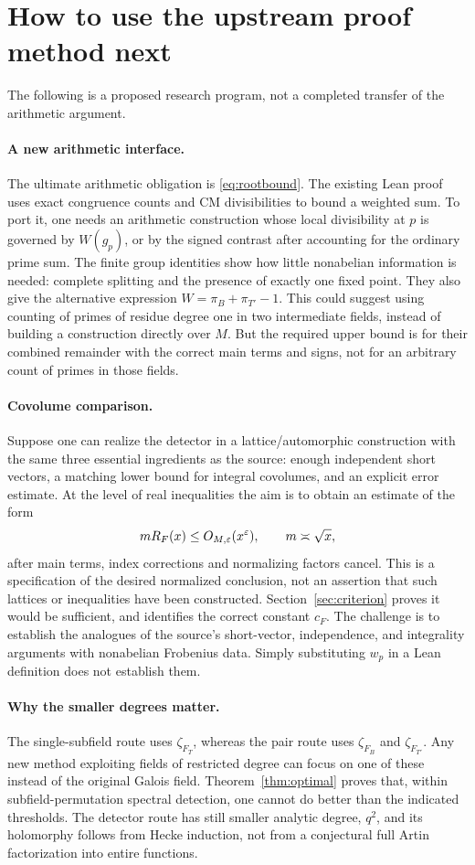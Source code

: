 \documentclass[11pt]{article}
\theoremstyle{remark}\newtheorem{remark}[theorem]{Remark}
\begin{document}
\section{How to use the upstream proof method next}
The following is a proposed research program, not a completed transfer of the arithmetic argument.

\paragraph{A new arithmetic interface.} The ultimate arithmetic obligation is \eqref{eq:rootbound}. The existing Lean proof uses exact congruence counts and CM divisibilities to bound a weighted sum. To port it, one needs an arithmetic construction whose local divisibility at $p$ is governed by $W(g_p)$, or by the signed contrast after accounting for the ordinary prime sum. The finite group identities show how little nonabelian information is needed: complete splitting and the presence of exactly one fixed point. They also give the alternative expression $W=\pi_B+\pi_{T'}-1$. This could suggest using counting of primes of residue degree one in two intermediate fields, instead of building a construction directly over $M$. But the required upper bound is for their combined remainder with the correct main terms and signs, not for an arbitrary count of primes in those fields.

\paragraph{Covolume comparison.} Suppose one can realize the detector in a lattice/automorphic construction with the same three essential ingredients as the source: enough independent short vectors, a matching lower bound for integral covolumes, and an explicit error estimate. At the level of real inequalities the aim is to obtain an estimate of the form
\[
 m R_F(x)\le O_{M,\varepsilon}(x^\varepsilon),\qquad m\asymp \sqrt{x},
\]
after main terms, index corrections and normalizing factors cancel. This is a specification of the desired normalized conclusion, not an assertion that such lattices or inequalities have been constructed. Section~\ref{sec:criterion} proves it would be sufficient, and identifies the correct constant $c_F$. The challenge is to establish the analogues of the source's short-vector, independence, and integrality arguments with nonabelian Frobenius data. Simply substituting $w_p$ in a Lean definition does not establish them.

\paragraph{Why the smaller degrees matter.} The single-subfield route uses $\zeta_{F_T}$, whereas the pair route uses $\zeta_{F_B}$ and $\zeta_{F_{T'}}$. Any new method exploiting fields of restricted degree can focus on one of these instead of the original Galois field. Theorem~\ref{thm:optimal} proves that, within subfield-permutation spectral detection, one cannot do better than the indicated thresholds. The detector route has still smaller analytic degree, $q^2$, and its holomorphy follows from Hecke induction, not from a conjectural full Artin factorization into entire functions.
\end{document}
